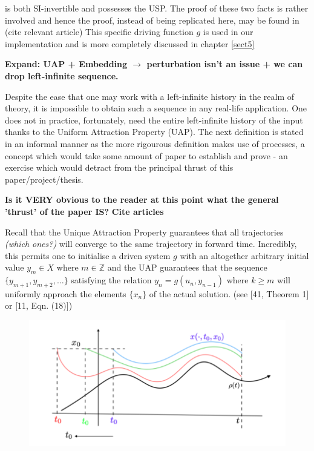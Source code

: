 \documentclass[12 pt]{article}
\begin{document}
is both SI-invertible and possesses the USP. The proof of these two facts is rather involved and  hence the proof, instead of being replicated here, may be found in (cite relevant article) 
This specific driving function $g$ is used in our implementation and is more completely discussed in chapter \ref{sect5}



\textbf{Expand: UAP + Embedding $\rightarrow$  perturbation isn’t an issue + we can drop left-infinite sequence.  }

Despite the ease that one may work with a left-infinite history in the realm of theory, it is impossible to obtain such a sequence in any real-life application.  
One does not in practice, fortunately, need the entire left-infinite history of the input thanks to the Uniform Attraction Property (UAP). 
The next definition is stated in an informal manner as the more rigourous definition makes use of processes, a concept which would take some amount of paper to establish and prove - an exercise which would detract from the principal thrust of this paper/project/thesis. 

\textbf{Is it VERY obvious to the reader at this point what the general 'thrust' of the paper IS?} \textbf{Cite articles}

Recall that the Unique Attraction Property guarantees that all trajectories \textit{(which ones?)} will converge to the same trajectory in forward time. 
Incredibly, this permits one to initialise a driven system $g$ with an altogether arbitrary initial value $y_m\in{X}$ where $m\in\mathbb{Z}$ and the UAP guarantees that the sequence $\{y_{m+1}, y_{m+2},\ldots\}$ satisfying the relation $y_n=g(u_n, y_{n-1})$  where $k\geq{m}$  will uniformly approach the elements $\{x_n\}$ of the actual solution. (see [41, Theorem 1] or [11, Eqn. (18)]) 
 

\begin{figure}[ht]
  \includegraphics[scale=0.4]{memloss_conttime.png}
  \centering
  \label{fig:memoryLosscont_time}
\end{figure}
\end{document}

